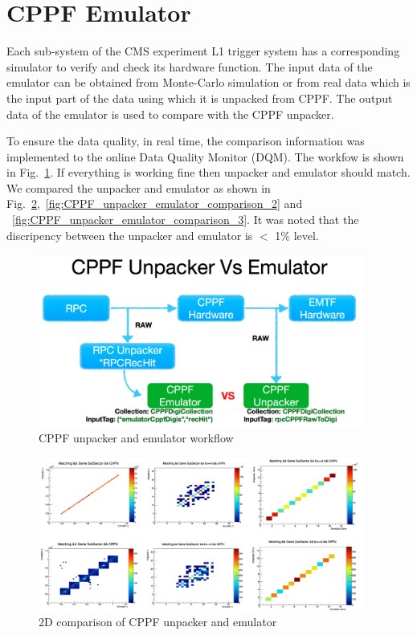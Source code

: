 \section{CPPF Emulator}
Each sub-system of the CMS experiment L1 trigger system has a corresponding simulator to verify and check its hardware function. The input data of the emulator can be obtained from Monte-Carlo simulation or from real data which is the input part of the data using which it is unpacked from CPPF. The output data of the emulator is used to compare with the CPPF unpacker. 

To ensure the data quality, in real time, the comparison information was implemented to the online Data Quality Monitor (DQM). The workfow is shown in Fig.~\ref{fig:CPPF_unpacker_emulator_workflow}.
If everything is working fine then unpacker and emulator should match. We compared the unpacker and emulator as shown in Fig.~\ref{fig:CPPF_unpacker_emulator_comparison_1},~\ref{fig:CPPF_unpacker_emulator_comparison_2} and ~\ref{fig:CPPF_unpacker_emulator_comparison_3}. It was noted that the discripency between the unpacker and emulator is $<$ 1\% level.

\begin{figure}[htb]
  \centering
  \includegraphics[width=0.95\textwidth]{Images/CPPF/CPPF_unpacker_emulator_workflow.png}
\caption{CPPF unpacker and emulator workflow} \label{fig:CPPF_unpacker_emulator_workflow}
\end{figure}


\begin{figure}[htb]
  \centering
  \includegraphics[width=0.95\textwidth]{Images/CPPF/CPPF_UnpEmu_Comparison_01.png}
\caption{2D comparison of CPPF unpacker and emulator} \label{fig:CPPF_unpacker_emulator_comparison_1}
\end{figure}

